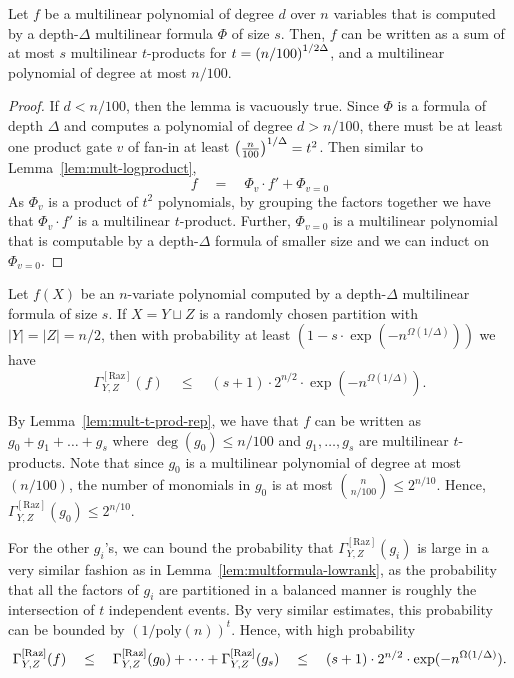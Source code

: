 \documentclass[12pt]{report}
\newcommand{\CM}[1]{\Gamma^{\mathrm{[#1]}}}
\begin{document}
\begin{lemma}\label{lem:mult-t-prod-rep}
Let $f$ be a multilinear polynomial of degree $d$ over $n$ variables that is computed by a depth-$\Delta$ multilinear formula $\Phi$ of size $s$. Then, $f$ can be written as a sum of at most $s$ multilinear $t$-products for $t = \left(n/100\right)^{1/2\Delta}$, and a multilinear polynomial of degree at most $n/100$.  
\end{lemma}
\begin{proof}
If $d < n/100$, then the lemma is vacuously true. Since $\Phi$ is a formula of depth $\Delta$ and computes a polynomial of degree $d > n/100$, there must be at least one product gate $v$ of fan-in at least $\left(\frac{n}{100}\right)^{1/\Delta} = t^2$. Then similar to Lemma~\ref{lem:mult-logproduct}, 
$$
f \quad=\quad \Phi_v \cdot f'  + \Phi_{v=0}
$$
As $\Phi_v$ is a product of $t^2$ polynomials, by grouping the factors together we have that $\Phi_v \cdot f'$ is a multilinear $t$-product. Further, $\Phi_{v=0}$ is a multilinear polynomial that is computable by a depth-$\Delta$ formula of smaller size and we can induct on $\Phi_{v=0}$. 
\end{proof}

\begin{lemma}\label{lem:mult-const-depth-upper-bound}
Let $f(X)$ be an $n$-variate polynomial computed by a depth-$\Delta$ multilinear formula of size $s$. If $X = Y \sqcup Z$ is a randomly chosen partition with $|Y| = |Z| = n/2$, then with probability at least $(1 - s \cdot \exp({-n^{\Omega(1/\Delta)}}))$ we have
$$
\CM{Raz}_{Y,Z}(f) \quad\leq\quad (s+1) \cdot 2^{n/2} \cdot \exp(-n^{\Omega(1/\Delta)}).
$$
\end{lemma}
\begin{proof-sketch}
By Lemma~\ref{lem:mult-t-prod-rep}, we have that $f$ can be written as $g_0 + g_1 + \dots + g_s$ where $\deg(g_0) \leq n/100$ and $g_1,\dots, g_s$ are multilinear $t$-products. Note that since $g_0$ is a multilinear polynomial of degree at most $(n/100)$, the number of monomials in $g_0$ is at most $\binom{n}{n/100} \leq 2^{n/10}$. Hence, $\CM{Raz}_{Y,Z}(g_0) \leq 2^{n/10}$. 

For the other $g_i$'s, we can bound the probability that $\CM{Raz}_{Y,Z}(g_i)$ is large in a very similar fashion as in Lemma~\ref{lem:multformula-lowrank}, as the probability that all the factors of $g_i$ are partitioned in a balanced manner is roughly the intersection of $t$ independent events. By very similar estimates, this probability can be bounded by $(1/\mathrm{poly}(n))^t$. Hence, with high probability 
$$
\CM{Raz}_{Y,Z}(f) \spaced{\leq} \CM{Raz}_{Y,Z}(g_0) + \dots + \CM{Raz}_{Y,Z}(g_s) \spaced{\leq} (s+1)\cdot 2^{n/2} \cdot \exp(-n^{\Omega(1/\Delta)}).
$$
\end{proof-sketch}
\end{document}

